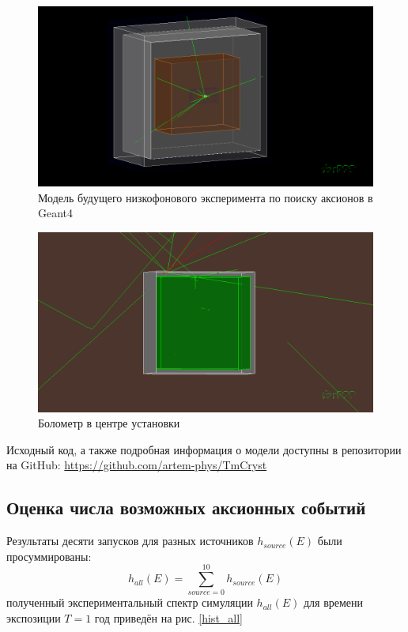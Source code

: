 \documentclass[a4paper,article,14pt]{extarticle}
\begin{document}
\begin{figure}[h]
    \centering
    \includegraphics[width = 0.85 \textwidth]{images/TmCrystVis.png}
    \caption{Модель будущего низкофонового эксперимента по поиску аксионов в Geant4}
    \label{TmVis}
\end{figure}

\begin{figure}[h!]
    \centering
    \includegraphics[width = 0.85 \textwidth]{images/Bolometer.png}
    \caption{Болометр в центре установки}
    \label{TmVisBol}
\end{figure}


Исходный код, а также подробная информация о модели доступны в репозитории на GitHub: \hyperlink{https://github.com/artem-phys/TmCryst}{https://github.com/artem-phys/TmCryst}


\subsection{Оценка числа возможных аксионных событий}
Результаты десяти запусков для разных источников $h_{source}\left( E \right)$ были просуммированы:
\begin{equation}
    h_{all} \left( E \right) = \sum\limits_{source = 0}^{10} {{h_{source}}\left( E \right)}
\end{equation}
полученный экспериментальный спектр симуляции $h_{all} \left( E \right)$ для времени экспозиции $T = 1 \text{ год}$ приведён на рис. \ref{hist_all}
\end{document}
